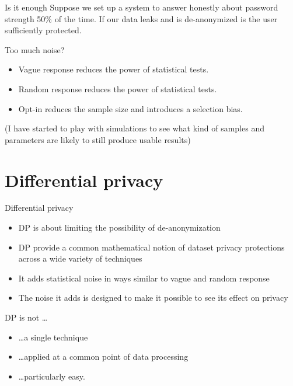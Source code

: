 \documentclass[xcolor={dvipsnames,table,hyperref}]{beamer}
\begin{document}
\begin{frame}{Is it enough}
  Suppose we set up a system to answer honestly about password strength 50\% of the time.
  If our data leaks and is de-anonymized is the user sufficiently protected.
\end{frame}

\begin{frame}{Too much noise?}
  \begin{itemize}
    \item Vague response reduces the power of statistical tests.
    \item Random response reduces the power of statistical tests.
    \item Opt-in reduces the sample size and introduces a selection bias.
  \end{itemize}
  (I have started to play with simulations to see what kind of samples and parameters are likely to still produce usable results)
\end{frame}

\section{Differential privacy}

\begin{frame}{Differential privacy}
  \begin{itemize}
    \item DP is about limiting the possibility of de-anonymization
    \item DP provide a common mathematical notion of dataset privacy protections across a wide variety of techniques
    \item It adds statistical noise in ways similar to vague and random response
    \item The noise it adds is designed to make it possible to see its effect on privacy
  \end{itemize}
\end{frame}

\begin{frame}{DP is not \dots}
  \begin{itemize}
    \item \dots a single technique
    \item \dots applied at a common point of data processing
    \item \dots particularly easy.
  \end{itemize}
\end{frame}
\end{document}
